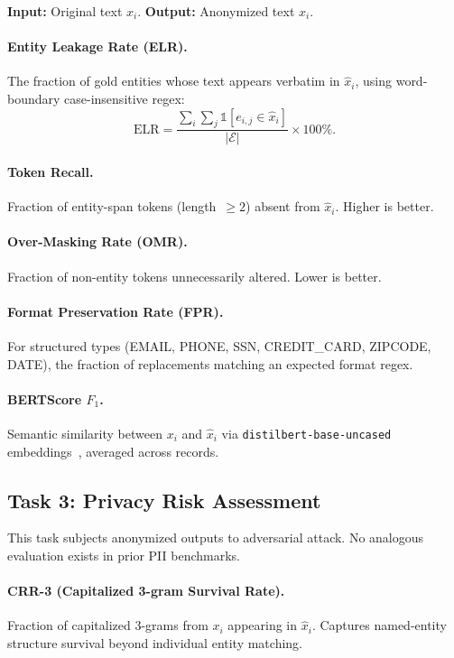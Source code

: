 \documentclass[10pt,twocolumn]{article}
\begin{document}
\textbf{Input:} Original text $x_i$. \textbf{Output:} Anonymized text $\hat{x}_i$.

\paragraph{Entity Leakage Rate (ELR).}
The fraction of gold entities whose text appears verbatim in $\hat{x}_i$, using word-boundary case-insensitive regex:
\begin{equation}
\text{ELR} = \frac{\sum_{i}\sum_{j} \mathbb{1}[e_{i,j} \in \hat{x}_i]}{|\mathcal{E}|} \times 100\%.
\end{equation}

\paragraph{Token Recall.}
Fraction of entity-span tokens (length~$\geq 2$) absent from $\hat{x}_i$. Higher is better.

\paragraph{Over-Masking Rate (OMR).}
Fraction of non-entity tokens unnecessarily altered. Lower is better.

\paragraph{Format Preservation Rate (FPR).}
For structured types (EMAIL, PHONE, SSN, CREDIT\_CARD, ZIPCODE, DATE), the fraction of replacements matching an expected format regex.

\paragraph{BERTScore $F_1$.}
Semantic similarity between $x_i$ and $\hat{x}_i$ via \texttt{distilbert-base-uncased} embeddings~\citep{zhang2020bertscore}, averaged across records.

\subsection{Task 3: Privacy Risk Assessment}

This task subjects anonymized outputs to adversarial attack.
No analogous evaluation exists in prior PII benchmarks.

\paragraph{CRR-3 (Capitalized 3-gram Survival Rate).}
Fraction of capitalized 3-grams from $x_i$ appearing in $\hat{x}_i$. Captures named-entity structure survival beyond individual entity matching.
\end{document}

